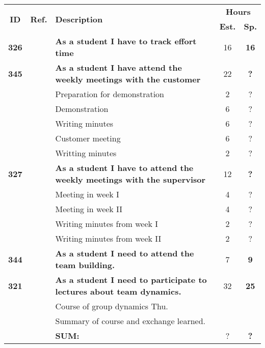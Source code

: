 \label{tab:sprint1storiesProcess}
\def\arraystretch{1.25}
 
\begin{longtable}{ccXcc}

\toprule[0.5mm]
\multirow{2}{*}{\textbf{ID}} &
\multirow{2}{*}{\textbf{Ref.}} & \multirow{2}{*}{\textbf{Description}} & \multicolumn{2}{c}{\textbf{Hours}} \\
 					& & & \textbf{Est.} & \textbf{Sp.} \\
\midrule

\textbf{326} 	& 
	& {\bf  As a student I have to track effort time} 	& 		16	& \textbf{16} \\
\textbf{345} 	& 
	& {\bf As a student I have attend the weekly meetings with the customer} 	
	& 	22	
	& \textbf{?} \\
		&& Preparation for demonstration	& 2 & ? \\
		&& Demonstration	& 6 & ? \\
		&& Writing minutes 	&  6 & ? \\	
		&& Customer meeting	&  6 & ? \\
		&& Writting minutes	&  2 & ? \\
		
\textbf{327} 	& 
	& {\bf As a student I have to attend the weekly meetings with the supervisor} 	
	& 	12	
	& \textbf{?} \\
		&& Meeting in week I	& 4 & ? \\
		&& Meeting in week II	& 4 & ? \\
		&& Writing minutes from week I 	&  2 & ? \\
		&& Writing minutes from week II	&  2 & ? \\	

\textbf{344} 	&& {\bf As a student I need to attend the team building.} 	& 		7	& \textbf{9} \\
		

\textbf{321} 	&& {\bf As a student I need to participate to lectures about team dynamics. } 	& 		32	& \textbf{25} \\
				&& Course of group dynamics Thu.	&  &  \\
				&& Summary of course and exchange learned.	&  &  \\				
				
\hline
				&& \textbf{SUM:}		&		?	& \textbf{?}
 \\																			
\bottomrule[0.5mm]
\end{longtable}
